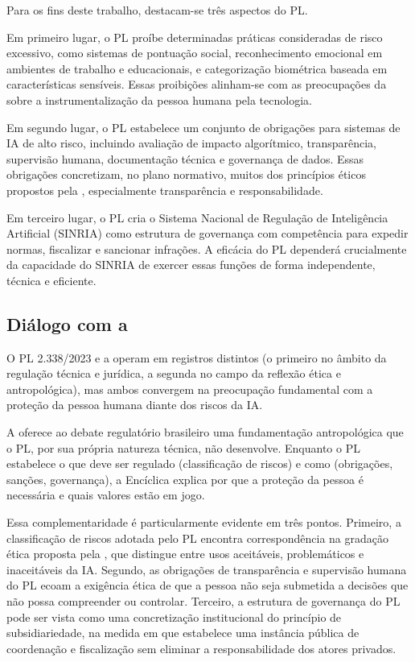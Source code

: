 Para os fins deste trabalho, destacam-se três aspectos do PL.

Em primeiro lugar, o PL proíbe determinadas práticas consideradas de risco excessivo, como sistemas de pontuação social, reconhecimento emocional em ambientes de trabalho e educacionais, e categorização biométrica baseada em características sensíveis. Essas proibições alinham-se com as preocupações da \MH{} sobre a instrumentalização da pessoa humana pela tecnologia.

Em segundo lugar, o PL estabelece um conjunto de obrigações para sistemas de IA de alto risco, incluindo avaliação de impacto algorítmico, transparência, supervisão humana, documentação técnica e governança de dados. Essas obrigações concretizam, no plano normativo, muitos dos princípios éticos propostos pela \MH{}, especialmente transparência e responsabilidade.

Em terceiro lugar, o PL cria o Sistema Nacional de Regulação de Inteligência Artificial (SINRIA) como estrutura de governança com competência para expedir normas, fiscalizar e sancionar infrações. A eficácia do PL dependerá crucialmente da capacidade do SINRIA de exercer essas funções de forma independente, técnica e eficiente.

\subsection{Diálogo com a \MH{}}
\label{subsec:dialogo-pl-mh}

O PL 2.338/2023 e a \MH{} operam em registros distintos (o primeiro no âmbito da regulação técnica e jurídica, a segunda no campo da reflexão ética e antropológica), mas ambos convergem na preocupação fundamental com a proteção da pessoa humana diante dos riscos da IA.

A \MH{} oferece ao debate regulatório brasileiro uma fundamentação antropológica que o PL, por sua própria natureza técnica, não desenvolve. Enquanto o PL estabelece o que deve ser regulado (classificação de riscos) e como (obrigações, sanções, governança), a Encíclica explica por que a proteção da pessoa é necessária e quais valores estão em jogo.

Essa complementaridade é particularmente evidente em três pontos. Primeiro, a classificação de riscos adotada pelo PL encontra correspondência na gradação ética proposta pela \MH{}, que distingue entre usos aceitáveis, problemáticos e inaceitáveis da IA. Segundo, as obrigações de transparência e supervisão humana do PL ecoam a exigência ética de que a pessoa não seja submetida a decisões que não possa compreender ou controlar. Terceiro, a estrutura de governança do PL pode ser vista como uma concretização institucional do princípio de subsidiariedade, na medida em que estabelece uma instância pública de coordenação e fiscalização sem eliminar a responsabilidade dos atores privados.


